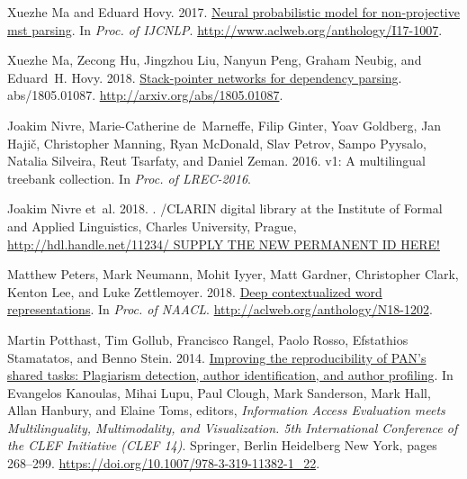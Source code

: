 \documentclass[11pt,a4paper]{article}
\begin{document}
\begin{thebibliography}{}
	Xuezhe Ma and Eduard Hovy. 2017.
	\newblock \href{http://www.aclweb.org/anthology/I17-1007}{Neural probabilistic
		model for non-projective mst parsing}.
	\newblock In {\em Proc. of IJCNLP\/}.
	\newblock
	\href{http://www.aclweb.org/anthology/I17-1007}{http://www.aclweb.org/anthology/I17-1007}.
	
	Xuezhe Ma, Zecong Hu, Jingzhou Liu, Nanyun Peng, Graham Neubig, and Eduard~H.
	Hovy. 2018.
	\newblock \href{http://arxiv.org/abs/1805.01087}{Stack-pointer networks for
		dependency parsing}.
	 abs/1805.01087.
	\newblock
	\href{http://arxiv.org/abs/1805.01087}{http://arxiv.org/abs/1805.01087}.
	
	Joakim Nivre, Marie-Catherine de~Marneffe, Filip Ginter, Yoav Goldberg, Jan
	Haji{\v{c}}, Christopher Manning, Ryan McDonald, Slav Petrov, Sampo Pyysalo,
	Natalia Silveira, Reut Tsarfaty, and Daniel Zeman. 2016.
	 v1: A multilingual treebank collection.
	\newblock In {\em Proc. of LREC-2016\/}.
	
	Joakim Nivre et~al. 2018.
	.
	/{CLARIN} digital library at the Institute of Formal and
	Applied Linguistics, Charles University, Prague,
	\url{http://hdl.handle.net/11234/ SUPPLY THE NEW PERMANENT ID HERE!}
	
	Matthew Peters, Mark Neumann, Mohit Iyyer, Matt Gardner, Christopher Clark,
	Kenton Lee, and Luke Zettlemoyer. 2018.
	\newblock \href{http://aclweb.org/anthology/N18-1202}{Deep contextualized word
		representations}.
	\newblock In {\em Proc. of NAACL\/}.
	\newblock
	\href{http://aclweb.org/anthology/N18-1202}{http://aclweb.org/anthology/N18-1202}.
	
	Martin Potthast, Tim Gollub, Francisco Rangel, Paolo Rosso, Efstathios
	Stamatatos, and Benno Stein. 2014.
	\newblock \href{https://doi.org/10.1007/978-3-319-11382-1\_{}22}{Improving the
		reproducibility of {PAN}'s shared tasks: Plagiarism detection, author
		identification, and author profiling}.
	\newblock In Evangelos Kanoulas, Mihai Lupu, Paul Clough, Mark Sanderson, Mark
	Hall, Allan Hanbury, and Elaine Toms, editors, {\em Information Access
		Evaluation meets Multilinguality, Multimodality, and Visualization. 5th
		International Conference of the {CLEF} Initiative ({CLEF} 14)\/}. Springer,
	Berlin Heidelberg New York, pages 268--299.
	\newblock
	\href{https://doi.org/10.1007/978-3-319-11382-1\_{}22}{https://doi.org/10.1007/978-3-319-11382-1\_{}22}.
	

\end{thebibliography}
\end{document}
